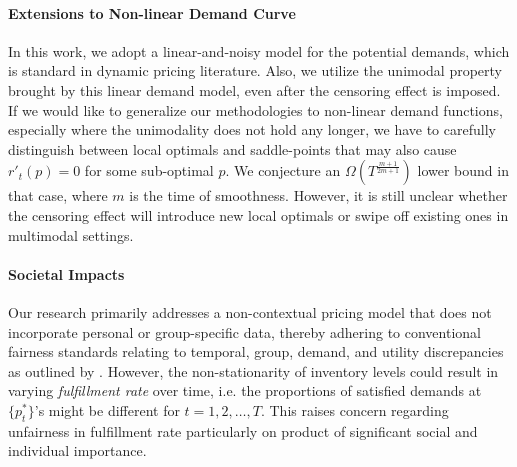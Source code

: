 \paragraph{Extensions to Non-linear Demand Curve}
In this work, we adopt a linear-and-noisy model for the potential demands, which is standard in dynamic pricing literature. Also, we utilize the unimodal property brought by this linear demand model, even after the censoring effect is imposed. If we would like to generalize our methodologies to non-linear demand functions, especially where the unimodality does not hold any longer, we have to carefully distinguish between local optimals and saddle-points that may also cause $r'_t(p)=0$ for some sub-optimal $p$. We conjecture an $\Omega(T^{\frac{m+1}{2m+1}})$ lower bound in that case, where $m$ is the time of smoothness. However, it is still unclear whether the censoring effect will introduce new local optimals or swipe off existing ones in multimodal settings.

\paragraph{Societal Impacts}
Our research primarily addresses a non-contextual pricing model that does not incorporate personal or group-specific data, thereby adhering to conventional fairness standards relating to temporal, group, demand, and utility discrepancies as outlined by \citet{cohen2022price, chen2023utility, xu2023doubly}. However, the non-stationarity of inventory levels could result in varying \emph{fulfillment rate} over time, i.e. the proportions of satisfied demands at $\{p_t^*\}$'s might be different for $t=1,2,\ldots, T$. This raises concern regarding unfairness in fulfillment rate \citep{spiliotopoulou2022fairness} particularly on product of significant social and individual importance.